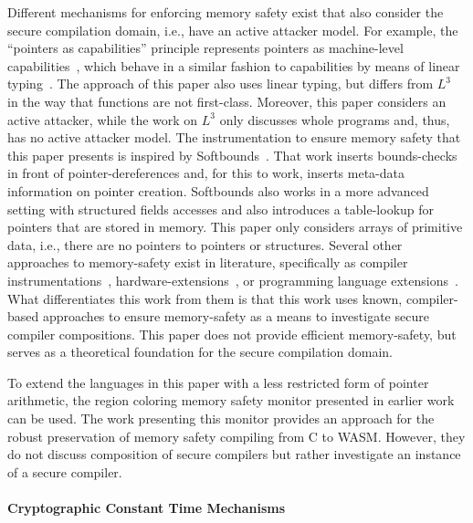 \documentclass[dvipsnames,conference]{IEEEtran}
\theoremstyle{definition}
\begin{document}
Different mechanisms for enforcing memory safety exist that also consider the secure compilation domain, i.e., have an active attacker model.
For example, the ``pointers as capabilities'' principle represents pointers as machine-level capabilities~\cite{korashy2021capableptrs}, which behave in a similar fashion to capabilities by means of linear typing~\cite{morrisett2005L3}.
The approach of this paper also uses linear typing, but differs from $L^{3}$~\cite{morrisett2005L3} in the way that functions are not first-class.
Moreover, this paper considers an active attacker, while the work on $L^{3}$ only discusses whole programs and, thus, has no active attacker model.
The instrumentation to ensure memory safety that this paper presents is inspired by Softbounds~\cite{nagarakatte2009soft}.
That work inserts bounds-checks in front of pointer-dereferences and, for this to work, inserts meta-data information on pointer creation.
Softbounds also works in a more advanced setting with structured fields accesses and also introduces a table-lookup for pointers that are stored in memory.
This paper only considers arrays of primitive data, i.e., there are no pointers to pointers or structures.
Several other approaches to memory-safety exist in literature, specifically as compiler instrumentations~\cite{akritidis2009baggy,younan2010paricheck,jung2021pico,shankaranarayana2023tailcheck,dhumbumroong2020boundwarden,nam2019framer,zhou2023fatptrs}, hardware-extensions~\cite{kwon2013lowfat,saileshwar2022heapcheck,chen2023flexpointer,kim2023whistle}, or programming language extensions~\cite{elliott2018checkedc,li2022formalcheckedc,jim2002cyclone,elliott2015guilt,west2005cuckoo,weis2019fyr,benoit2019uniqueness}.
What differentiates this work from them is that this work uses known, compiler-based approaches to ensure memory-safety as a means to investigate secure compiler compositions.
This paper does not provide efficient memory-safety, but serves as a theoretical foundation for the secure compilation domain.

To extend the languages in this paper with a less restricted form of pointer arithmetic, the region coloring memory safety monitor presented in earlier work~\cite{michael2023mswasm} can be used.
The work presenting this monitor provides an approach for the robust preservation of memory safety compiling from C to WASM.
However, they do not discuss composition of secure compilers but rather investigate an instance of a secure compiler.

\paragraph*{Cryptographic Constant Time Mechanisms}\label{subsec:relw:cctmechs}
\end{document}
